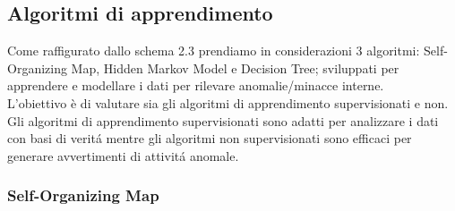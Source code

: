 \documentclass[../tesi.tex]{subfiles}
\begin{document}
\subsection{Algoritmi di apprendimento}

Come raffigurato dallo schema 2.3 prendiamo in considerazioni 3 algoritmi: Self-Organizing Map, Hidden Markov Model e Decision Tree; sviluppati per apprendere e modellare i dati per rilevare anomalie/minacce interne.\\
L’obiettivo è di valutare sia gli algoritmi di apprendimento supervisionati e non.\\
Gli algoritmi di apprendimento supervisionati sono adatti per analizzare i dati con basi di veritá mentre gli algoritmi non supervisionati sono efficaci per generare avvertimenti di attivitá anomale.

\subsubsection{Self-Organizing Map}

\end{document}
